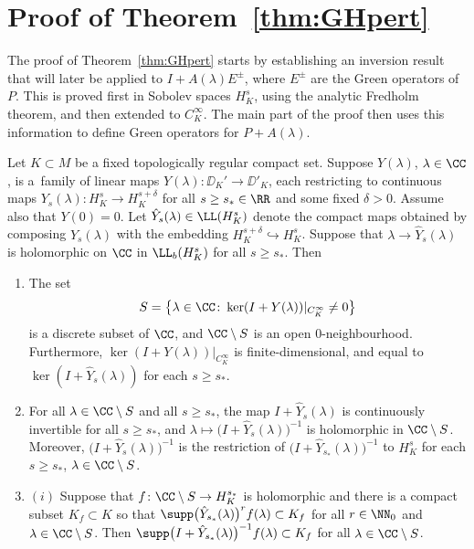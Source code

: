  \section{Proof of Theorem~\ref{thm:GHpert}}\label{sec:proof}

 The proof of Theorem~\ref{thm:GHpert} starts by establishing an inversion result that will later be applied to $I+A(\lambda)E^\pm$, where $E^\pm$ are the Green operators of $P$. This is proved first in Sobolev spaces $H^s_K$, using the analytic Fredholm theorem, and then extended to $C^\infty_K$. The main part of the proof then uses this information to define Green operators for $P+ A(\lambda)$.


 \begin{Theorem}\label{thm:Sobolevinversion}
 	Let $K\subset M$ be a fixed topologically regular compact set. Suppose
 	$Y(\lambda)$, $\lambda\in\CC$, is a~family of linear maps
 	$Y(\lambda)\colon\DD_K'\to\DD'_K$, each restricting to continuous maps $Y_s(\lambda)\colon H^s_K\to H^{s+\delta}_K$ for all $s\ge s_*\in\RR$ and some fixed $\delta>0$. Assume also that $Y(0)=0$.
 	Let $\hat{Y}_s(\lambda)\in\LL(H^s_K)$ denote the compact maps obtained by composing $Y_s(\lambda)$ with the embedding $H^{s+\delta}_K\hookrightarrow H^s_K$. Suppose that $\lambda \to \hat{Y}_s(\lambda)$ is holomorphic on $\CC$ in $\LL_b(H^s_K)$ for all $s\ge s_*$. Then
 	\begin{enumerate}\itemsep=0pt
 		\item[$(a)$] The set
 		\begin{equation}\label{eq:Sdef}
 			S=\big\{\lambda\in\CC\colon \ker (I+ Y(\lambda))|_{C^\infty_K}\neq 0\big\}
 		\end{equation}
 		is a discrete subset of $\CC$, and $\CC\setminus S$ is an open $0$-neighbourhood. Furthermore, $\ker (I+ Y(\lambda))|_{C^\infty_K}$ is finite-dimensional, and equal to
 		$\ker (I+ \hat{Y}_s(\lambda))$ for each $s\ge s_*$.
 		
 		\item[$(b)$] For all $\lambda\in \CC\setminus S$ and all $s\ge s_*$, the map $I+ \hat{Y}_{s}(\lambda)$ is continuously invertible for all $s\ge s_*$, and $\lambda\mapsto \big(I+ \hat{Y}_{s}(\lambda)\big)^{-1}$ is holomorphic in $\CC\setminus S$. Moreover,
 		$\big(I+ \hat{Y}_{s}(\lambda)\big)^{-1}$ is the restriction of $\big(I+ \hat{Y}_{s_*}(\lambda)\big)^{-1}$ to $H^s_K$ for each $s\ge s_*$, $\lambda\in\CC\setminus S$.
 		
 		\item[$(c)$] $(i)$ Suppose that $f\colon \CC\setminus S\to H^{s_*}_K$ is holomorphic and
 		there is a compact subset ${K_f\subset K}$ so that $\supp \big(\hat{Y}_{s_*}(\lambda)\big)^r f(\lambda)\subset K_f$ for all $r\in\NN_0$ and $\lambda\in \CC\setminus S$. Then $\supp \big(I+\hat{Y}_{s_*}(\lambda)\big)^{-1}f(\lambda)\subset K_f$ for all $\lambda\in \CC\setminus S$.
 		

\end{enumerate}
\end{Theorem}
